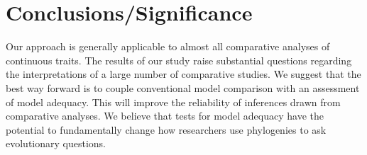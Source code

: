 \documentclass[a4paper,12pt]{article}
\begin{document}
\section*{Conclusions/Significance}

Our approach is generally applicable to almost all comparative analyses of continuous traits. The results of our study raise substantial questions regarding the interpretations of a large number of comparative studies. We suggest that the best way forward is to couple conventional model comparison with an assessment of model adequacy. This will improve the reliability of inferences drawn from comparative analyses. We believe that tests for model adequacy have the potential to fundamentally change how researchers use phylogenies to ask evolutionary questions. 



\end{document}
